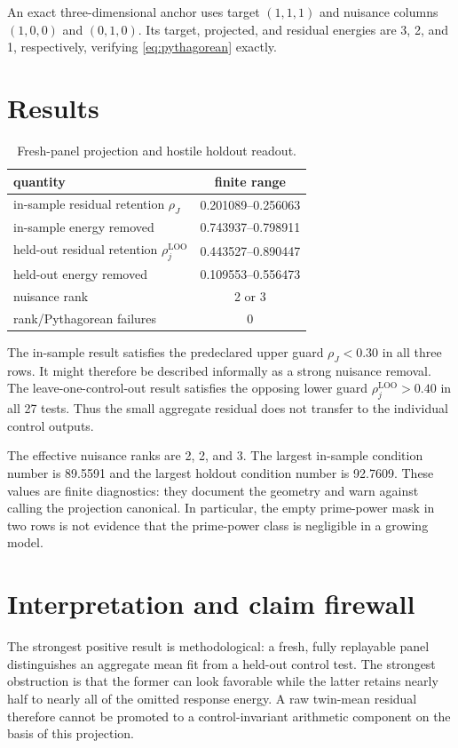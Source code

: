 \documentclass[10pt]{article}
\begin{document}
An exact three-dimensional anchor uses target $(1,1,1)$ and nuisance columns
$(1,0,0)$ and $(0,1,0)$.  Its target, projected, and residual energies are
3, 2, and 1, respectively, verifying \eqref{eq:pythagorean} exactly.

\section{Results}

\begin{table}[ht]
\centering\small
\caption{Fresh-panel projection and hostile holdout readout.}
\label{tab:results}
\begin{tabular}{lc}
\toprule
quantity & finite range\\
\midrule
in-sample residual retention $\rho_J$ & 0.201089--0.256063\\
in-sample energy removed & 0.743937--0.798911\\
held-out residual retention $\rho^{\mathrm{LOO}}_j$ & 0.443527--0.890447\\
held-out energy removed & 0.109553--0.556473\\
nuisance rank & 2 or 3\\
rank/Pythagorean failures & 0\\
\bottomrule
\end{tabular}
\end{table}

The in-sample result satisfies the predeclared upper guard $\rho_J<0.30$ in
all three rows.  It might therefore be described informally as a strong
nuisance removal.  The leave-one-control-out result satisfies the opposing
lower guard $\rho^{\mathrm{LOO}}_j>0.40$ in all 27 tests.  Thus the small
aggregate residual does not transfer to the individual control outputs.

The effective nuisance ranks are 2, 2, and 3.  The largest in-sample condition
number is 89.5591 and the largest holdout condition number is 92.7609.  These
values are finite diagnostics: they document the geometry and warn against
calling the projection canonical.  In particular, the empty prime-power mask
in two rows is not evidence that the prime-power class is negligible in a
growing model.

\section{Interpretation and claim firewall}

The strongest positive result is methodological: a fresh, fully replayable
panel distinguishes an aggregate mean fit from a held-out control test.  The
strongest obstruction is that the former can look favorable while the latter
retains nearly half to nearly all of the omitted response energy.  A raw
twin-mean residual therefore cannot be promoted to a control-invariant
arithmetic component on the basis of this projection.
\end{document}
